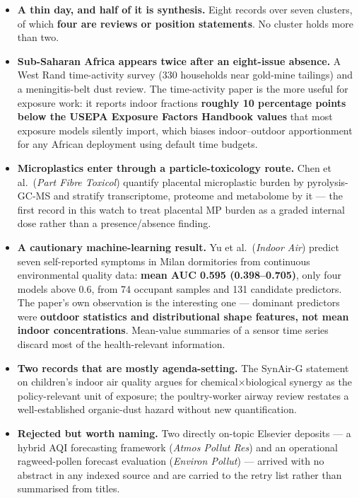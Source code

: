 \documentclass[10pt]{article}
\begin{document}
\footnotesize
\begin{itemize}
\item \textbf{A thin day, and half of it is synthesis.} Eight records over seven clusters,
of which \textbf{four are reviews or position statements}. No cluster holds more than two.

\item \textbf{Sub-Saharan Africa appears twice after an eight-issue absence.} A West Rand
time-activity survey (330 households near gold-mine tailings) and a meningitis-belt dust
review. The time-activity paper is the more useful for exposure work: it reports indoor
fractions \textbf{roughly 10 percentage points below the USEPA Exposure Factors Handbook
values} that most exposure models silently import, which biases indoor--outdoor
apportionment for any African deployment using default time budgets.

\item \textbf{Microplastics enter through a particle-toxicology route.} Chen et al.\
(\textit{Part Fibre Toxicol}) quantify placental microplastic burden by pyrolysis-GC-MS
and stratify transcriptome, proteome and metabolome by it --- the first record in this
watch to treat placental MP burden as a graded internal dose rather than a
presence/absence finding.

\item \textbf{A cautionary machine-learning result.} Yu et al.\ (\textit{Indoor Air})
predict seven self-reported symptoms in Milan dormitories from continuous environmental
quality data: \textbf{mean AUC 0.595 (0.398--0.705)}, only four models above 0.6, from 74
occupant samples and 131 candidate predictors. The paper's own observation is the
interesting one --- dominant predictors were \textbf{outdoor statistics and
distributional shape features, not mean indoor concentrations}. Mean-value summaries of a
sensor time series discard most of the health-relevant information.

\item \textbf{Two records that are mostly agenda-setting.} The SynAir-G statement on
children's indoor air quality argues for chemical$\times$biological synergy as the
policy-relevant unit of exposure; the poultry-worker airway review restates a
well-established organic-dust hazard without new quantification.

\item \textbf{Rejected but worth naming.} Two directly on-topic Elsevier deposits --- a
hybrid AQI forecasting framework (\textit{Atmos Pollut Res}) and an operational
ragweed-pollen forecast evaluation (\textit{Environ Pollut}) --- arrived with no abstract
in any indexed source and are carried to the retry list rather than summarised from
titles.
\end{itemize}
\end{document}
